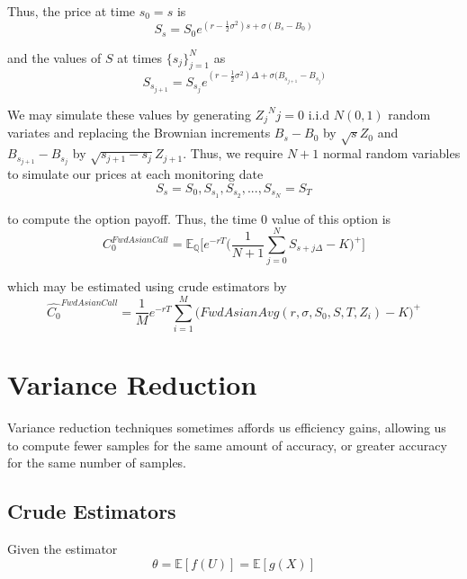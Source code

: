 \documentclass[12pt]{article}
\newlength\tindent
\renewcommand{\indent}{\hspace*{\tindent}}
\begin{document}
Thus, the price at time $s_0 = s$ is
\begin{equation*}
	S_s = S_0 e^{(r - \frac{1}{2}\sigma^2)s + \sigma (B_s - B_0)}
\end{equation*} 

and the values of $S$ at times $\{s_j\}^N_{j = 1}$ as
\begin{equation*}
	S_{s_{j + 1}} = S_{s_j} e^{(r - \frac{1}{2}\sigma^2)\Delta + \sigma \big(B_{s_{j+1}} - B_{s_j}\big)}
\end{equation*}

\indent We may simulate these values by generating ${Z_j}^N{j=0}$ i.i.d $N(0,1)$ random variates and replacing the Brownian increments $B_s - B_0$ by $\sqrt{s}Z_0$ and $B_{s_{j+1}} - B_{s_j}$ by $\sqrt{s_{j+1} - s_j}Z_{j+1}$. Thus, we require $N + 1$ normal random variables to simulate our prices at each monitoring date
\begin{equation*}
	S_s = S_0, S_{s_1}, S_{s_2}, ..., S_{s_N} = S_T
\end{equation*}

to compute the option payoff. Thus, the time 0 value of this option is
\begin{equation*}
	C_0^{FwdAsianCall} = \mathbb E_{\mathbb Q}\bigg[e^{-rT} \bigg(\frac{1}{N+1}\sum^{N}_{j=0} S_{s + j\Delta} - K \bigg)^+ \bigg]
\end{equation*}

which may be estimated using crude estimators by
\begin{equation*}
	\hat{C_0}^{FwdAsianCall} = \frac{1}{M}e^{-rT} \sum^M_{i=1} \big(FwdAsianAvg(r,\sigma,S_0,S,T,Z_i) - K\big)^+
\end{equation*}

\section{Variance Reduction}

\indent Variance reduction techniques sometimes affords us efficiency gains, allowing us to compute fewer samples for the same amount of accuracy, or greater accuracy for the same number of samples.

\subsection{Crude Estimators}

Given the estimator
\begin{equation*}
	\theta = \mathbb E[f(U)] = \mathbb E[g(X)]
\end{equation*}
\end{document}
